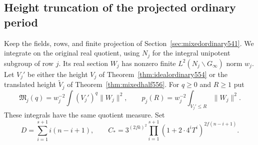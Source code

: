 \documentclass[a4paper,11pt]{article}
\theoremstyle{definition}
\theoremstyle{remark}
\numberwithin{equation}{section}
\begin{document}
\subsection{Height truncation of the projected ordinary period}
\label{sec:truncatedordinary592}

Keep the fields, rows, and finite projection of
Section~\ref{sec:mixedordinary541}. We integrate on the
original real quotient, using \(N_j\) for the integral
unipotent subgroup of row \(j\). Its real section \(W_j\)
has nonzero finite \(L^2(N_j\backslash G_\infty)\) norm \(w_j\).
Let \(V_j'\) be either the height \(V_j\) of
Theorem~\ref{thm:idealordinary554} or the translated height
\(\widetilde V_j\) of Theorem~\ref{thm:mixedhalf556}.
For \(q\ge0\) and \(R\ge1\) put
\[
 \mathfrak M_j(q)=w_j^{-2}\int (V_j')^q\|W_j\|^2,\qquad
 p_j(R)=w_j^{-2}\int_{V_j'\le R}\|W_j\|^2 .
\]
These integrals have the same quotient measure. Set
\[
 D=\sum_{i=1}^{s+1}i(n-i+1),\qquad
 C_*=3^{(2fk)^2}\prod_{i=1}^{s+1}
            (1+2\cdot4^iT^i)^{2f(n-i+1)} .
\]
\end{document}

